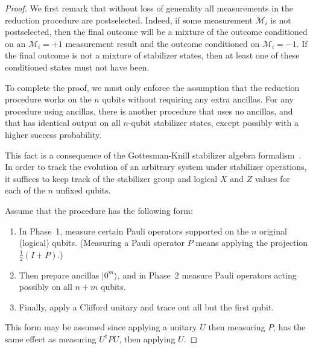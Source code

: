 \documentclass[11pt]{article}
\def\ket #1{\vert #1\rangle}
\theoremstyle{note}
\begin{document}
\begin{proof}
We first remark that without loss of generality all measurements in the reduction procedure are postselected.  Indeed, if some measurement $\mathcal{M}_i$ is not postselected, then the final outcome will be a mixture of the outcome conditioned on an $\mathcal{M}_i = +1$ measurement result and the outcome conditioned on $\mathcal{M}_i = -1$.  If the final outcome is not a mixture of stabilizer states, then at least one of these conditioned states must not have been.

To complete the proof, we must only enforce the assumption that the reduction procedure works on the $n$ qubits without requiring any extra ancillas.  For any procedure using ancillas, there is another procedure that uses no ancillas, and that has identical output on all $n$-qubit stabilizer states, except possibly with a higher success probability.  

This fact is a consequence of the Gottesman-Knill stabilizer algebra formalism~\cite{Gottesman97}.  In order to track the evolution of an arbitrary system under stabilizer operations, it suffices to keep track of the stabilizer group and logical $X$ and $Z$ values for each of the $n$ unfixed qubits.  

Assume that the procedure has the following form: 
\begin{enumerate}
\item In Phase~1, measure certain Pauli operators supported on the $n$ original (logical) qubits.  (Measuring a Pauli operator $P$ means applying the projection $\tfrac{1}{2}(I + P)$.)
\item Then prepare ancillas $\ket{0^m}$, and in Phase~2 measure Pauli operators acting possibly on all $n+m$ qubits.  
\item Finally, apply a Clifford unitary and trace out all but the first qubit.
\end{enumerate}
This form may be assumed since applying a unitary $U$ then measuring $P$, has the same effect as measuring $U^\dagger P U$, then applying $U$.  


\end{proof}
\end{document}
